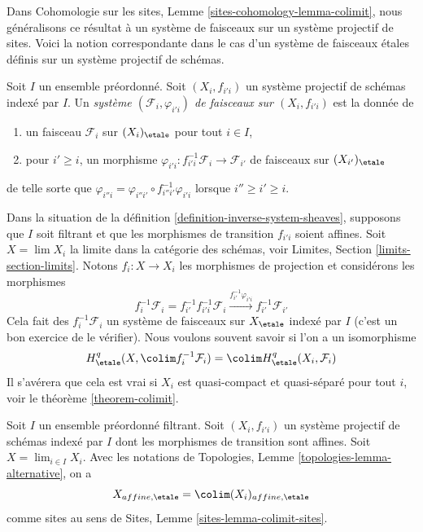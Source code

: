 \medskip\noindent
Dans Cohomologie sur les sites, Lemme \ref{sites-cohomology-lemma-colimit},
nous g\'en\'eralisons ce r\'esultat \`a un syst\`eme de faisceaux
sur un syst\`eme projectif de sites. Voici la notion correspondante
dans le cas d'un syst\`eme de faisceaux \'etales d\'efinis
sur un syst\`eme projectif de sch\'emas.

\begin{definition}
\label{definition-inverse-system-sheaves}
Soit $I$ un ensemble pr\'eordonn\'e. Soit $(X_i, f_{i'i})$ un syst\`eme
projectif de sch\'emas index\'e par $I$.
Un {\it syst\`eme $(\mathcal{F}_i, \varphi_{i'i})$ de faisceaux
sur $(X_i, f_{i'i})$} est la donn\'ee de
\begin{enumerate}
\item un faisceau $\mathcal{F}_i$ sur $(X_i)_\etale$ pour tout $i \in I$,
\item pour $i' \geq i$, un morphisme
$\varphi_{i'i} : f_{i'i}^{-1}\mathcal{F}_i \to \mathcal{F}_{i'}$
de faisceaux sur $(X_{i'})_\etale$
\end{enumerate}
de telle sorte que $\varphi_{i''i} = \varphi_{i''i'} \circ f_{i'' i'}^{-1}\varphi_{i'i}$
lorsque $i'' \geq i' \geq i$.
\end{definition}

\noindent
Dans la situation de la d\'efinition \ref{definition-inverse-system-sheaves},
supposons que $I$ soit filtrant et que les morphismes de transition $f_{i'i}$ soient affines.
Soit $X = \lim X_i$ la limite dans la cat\'egorie des sch\'emas, voir
Limites, Section \ref{limits-section-limits}.
Notons $f_i : X \to X_i$ les morphismes de projection et consid\'erons les morphismes
$$
f_i^{-1}\mathcal{F}_i = f_{i'}^{-1}f_{i'i}^{-1}\mathcal{F}_i
\xrightarrow{f_{i'}^{-1}\varphi_{i'i}}
f_{i'}^{-1}\mathcal{F}_{i'}
$$
Cela fait des $f_i^{-1}\mathcal{F}_i$ un syst\`eme de faisceaux sur $X_\etale$
index\'e par $I$ (c'est un bon exercice de le v\'erifier).
Nous voulons souvent savoir si l'on a un isomorphisme
$$
H^q_\etale(X, \colim f_i^{-1}\mathcal{F}_i) =
\colim H^q_\etale(X_i, \mathcal{F}_i)
$$
Il s'av\'erera que cela est vrai si $X_i$ est quasi-compact et quasi-s\'epar\'e
pour tout $i$, voir le th\'eor\`eme \ref{theorem-colimit}.

\begin{lemma}
\label{lemma-colimit-affine-sites}
Soit $I$ un ensemble pr\'eordonn\'e filtrant. Soit $(X_i, f_{i'i})$ un syst\`eme
projectif de sch\'emas index\'e par $I$ dont les morphismes de transition sont affines.
Soit $X = \lim_{i \in I} X_i$. Avec les
notations de Topologies, Lemme \ref{topologies-lemma-alternative}, on a
$$
X_{affine, \etale} = \colim (X_i)_{affine, \etale}
$$
comme sites au sens de
Sites, Lemme \ref{sites-lemma-colimit-sites}.
\end{lemma}

